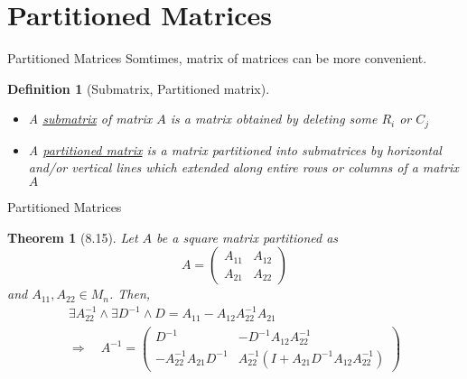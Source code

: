 \documentclass[a4paper,11pt]{article}
\newtheorem{defn}{Definition}
\newtheorem{thm}{Theorem}
\begin{document}
%

\section{Partitioned Matrices} %
\label{sec:partitioned_matrices}
\begin{frame}[t]{Partitioned Matrices}
	Somtimes, matrix of matrices can be more convenient.
	\begin{defn}
		[Submatrix, Partitioned matrix]
		\begin{itemize}
			\item A \uline{submatrix} of matrix $A$ is a matrix obtained by deleting some $R_i$ or $C_j$
			\item A \uline{partitioned matrix} is a matrix partitioned into submatrices by horizontal and/or vertical lines which extended along entire rows or columns of a matrix $A$
		\end{itemize}
	\end{defn}
\end{frame}
\begin{frame}[t]{Partitioned Matrices}
	\begin{thm}
		[8.15] Let $A$ be a square matrix partitioned as\[
			A=\begin{pmatrix}
				A_{11}&A_{12}\\
				A_{21}&A_{22}
			\end{pmatrix}
		\] and $A_{11}, A_{22}\in M_n$. Then, 
		\begin{multline*}
			\exists A_{22}^{-1}\land \exists D^{-1} \land D=A_{11}-A_{12}A_{22}^{-1}A_{21} \\\Rightarrow\quad A^{-1}=\begin{pmatrix}
				D^{-1}& -D^{-1}A_{12}A_{22}^{-1}\\
				-A_{22}^{-1}A_{21}D^{-1}&A_{22}^{-1}(I+A_{21}D^{-1}A_{12}A_{22}^{-1})
			\end{pmatrix}
		\end{multline*}
	\end{thm}
\end{frame}

%
\end{document}
